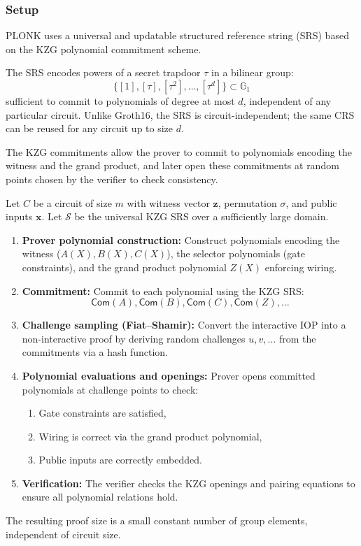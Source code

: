 \subsubsection*{Setup}

PLONK uses a universal and updatable structured reference string (SRS) based on the KZG polynomial commitment scheme.  

The SRS encodes powers of a secret trapdoor $\tau$ in a bilinear group:
\[
\{[1],[\tau],[\tau^2],\dots,[\tau^d]\} \subset \mathbb{G}_1
\]  
sufficient to commit to polynomials of degree at most $d$, independent of any particular circuit. Unlike Groth16, the SRS is circuit-independent; the same CRS can be reused for any circuit up to size $d$.

The KZG commitments allow the prover to commit to polynomials encoding the witness and the grand product, and later open these commitments at random points chosen by the verifier to check consistency.

\myspace

\begin{protocol}[PLONK]
Let $C$ be a circuit of size $m$ with witness vector $\mathbf{z}$, permutation $\sigma$, and public inputs $\mathbf{x}$.  
Let $\mathcal{S}$ be the universal KZG SRS over a sufficiently large domain.

\begin{enumerate}
    \item \textbf{Prover polynomial construction:}  
    Construct polynomials encoding the witness ($A(X),B(X),C(X)$), the selector polynomials (gate constraints), and the grand product polynomial $Z(X)$ enforcing wiring.
    
    \item \textbf{Commitment:}  
    Commit to each polynomial using the KZG SRS: 
    \[
    \mathsf{Com}(A), \mathsf{Com}(B), \mathsf{Com}(C), \mathsf{Com}(Z), \dots
    \]
    
    \item \textbf{Challenge sampling (Fiat–Shamir):}  
    Convert the interactive IOP into a non-interactive proof by deriving random challenges $u,v,\dots$ from the commitments via a hash function.
    
    \item \textbf{Polynomial evaluations and openings:}  
    Prover opens committed polynomials at challenge points to check:
    \begin{enumerate}
        \item Gate constraints are satisfied,
        \item Wiring is correct via the grand product polynomial,
        \item Public inputs are correctly embedded.
    \end{enumerate}
    
    \item \textbf{Verification:}  
    The verifier checks the KZG openings and pairing equations to ensure all polynomial relations hold.
\end{enumerate}
The resulting proof size is a small constant number of group elements, independent of circuit size.
\end{protocol}

